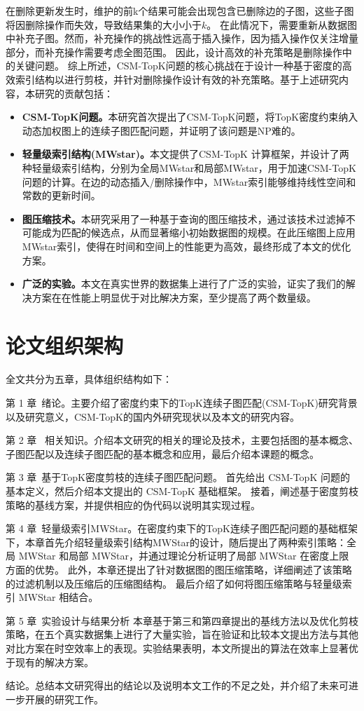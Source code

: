    在删除更新发生时，维护的前k个结果可能会出现包含已删除边的子图，这些子图将因删除操作而失效，导致结果集的大小小于$k$。
   在此情况下，需要重新从数据图中补充子图。然而，补充操作的挑战性远高于插入操作，因为插入操作仅关注增量部分，而补充操作需要考虑全图范围。
   因此，设计高效的补充策略是删除操作中的关键问题。
   综上所述，CSM-TopK问题的核心挑战在于设计一种基于密度的高效索引结构以进行剪枝，并针对删除操作设计有效的补充策略。基于上述研究内容，本研究的贡献包括：
\begin{itemize}[label={\textbullet}]
    \item \textbf{CSM-TopK问题。}本研究首次提出了CSM-TopK问题，将TopK密度约束纳入动态加权图上的连续子图匹配问题，并证明了该问题是NP难的。
    \item \textbf{轻量级索引结构(MWstar)。}本文提供了CSM-TopK 计算框架，并设计了两种轻量级索引结构，分别为全局MWstar和局部MWstar，用于加速CSM-TopK问题的计算。在边的动态插入/删除操作中，MWstar索引能够维持线性空间和常数的更新时间。
    \item \textbf{图压缩技术。}本研究采用了一种基于查询的图压缩技术，通过该技术过滤掉不可能成为匹配的候选点，从而显著缩小初始数据图的规模。在此压缩图上应用 MWstar索引，使得在时间和空间上的性能更为高效，最终形成了本文的优化方案。
    \item \textbf{广泛的实验。}本文在真实世界的数据集上进行了广泛的实验，证实了我们的解决方案在在性能上明显优于对比解决方案，至少提高了两个数量级。
  \end{itemize}
\section{论文组织架构}
全文共分为五章，具体组织结构如下：

第 1 章\ 绪论。主要介绍了密度约束下的TopK连续子图匹配(CSM-TopK)研究背景以及研究意义，CSM-TopK的国内外研究现状以及本文的研究内容。

第 2 章 \ 相关知识。介绍本文研究的相关的理论及技术，主要包括图的基本概念、子图匹配以及连续子图匹配的基本概念和应用，最后介绍本课题的概念。

第 3 章\ 基于TopK密度剪枝的连续子图匹配问题。
首先给出 CSM-TopK 问题的基本定义，然后介绍本文提出的 CSM-TopK 基础框架。
接着，阐述基于密度剪枝策略的基线方案，并提供相应的伪代码以说明其实现过程。

第 4 章\ 轻量级索引MWStar。在密度约束下的TopK连续子图匹配问题的基础框架下，本章首先介绍轻量级索引结构MWStar的设计，随后提出了两种索引策略：全局 MWStar 和局部 MWStar，并通过理论分析证明了局部 MWStar 在密度上限方面的优势。
此外，本章还提出了针对数据图的图压缩策略，详细阐述了该策略的过滤机制以及压缩后的压缩图结构。
最后介绍了如何将图压缩策略与轻量级索引 MWStar 相结合。

第 5 章\ 实验设计与结果分析
本章基于第三和第四章提出的基线方法以及优化剪枝策略，在五个真实数据集上进行了大量实验，旨在验证和比较本文提出方法与其他对比方案在时空效率上的表现。实验结果表明，本文所提出的算法在效率上显著优于现有的解决方案。

结论。总结本文研究得出的结论以及说明本文工作的不足之处，并介绍了未来可进一步开展的研究工作。
